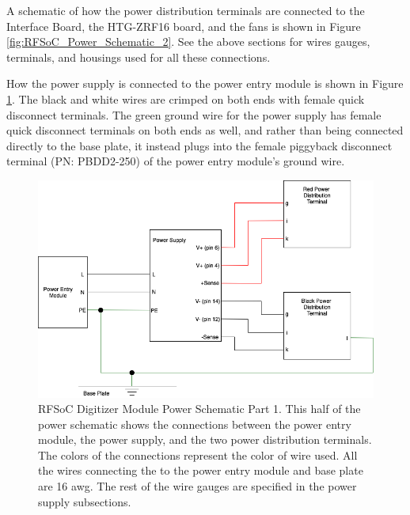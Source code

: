 \documentclass[12pt,a4paper,oneside]{article}
\begin{document}
A schematic of how the power distribution terminals are connected to the Interface Board, the HTG-ZRF16 board, and the fans is shown in Figure \ref{fig:RFSoC_Power_Schematic_2}. See the above sections for wires gauges, terminals, and housings used for all these connections. 

How the power supply is connected to the power entry module is shown in Figure \ref{fig:RFSoC_Power_Schematic_1}. The black and white wires are crimped on both ends with female quick disconnect terminals. The green ground wire for the power supply has female quick disconnect terminals on both ends as well, and rather than being connected directly to the base plate, it instead plugs into the female piggyback disconnect terminal (PN:
PBDD2-250) of the power entry module's ground wire. 

\begin{figure}[H]
\centering
\includegraphics[width=1\linewidth]{figures/RFSoC_Power_Schematic_1.png}
\caption{RFSoC Digitizer Module Power Schematic Part 1. This half of the power schematic shows the connections between the power entry module, the power supply, and the two power distribution terminals. The colors of the connections represent the color of wire used. All the wires connecting the to the power entry module and base plate are 16 awg. The rest of the wire gauges are specified  in the power supply subsections.}
\label{fig:RFSoC_Power_Schematic_1}
\end{figure}
\end{document}
